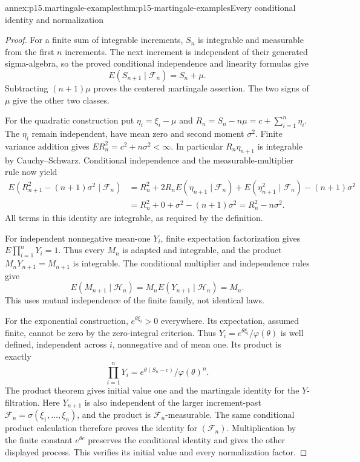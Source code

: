 
\begin{annexitem}{annex:p15.martingale-examples}{thm:p15-martingale-examples}{Every conditional identity and normalization}
\begin{proof}
For a finite sum of integrable increments, \(S_n\) is integrable
and measurable from the first \(n\) increments.
The next increment is independent of their generated sigma-algebra,
so the proved conditional independence and linearity formulas give
\[
                     E(S_{n+1}\mid\mathcal F_n)=S_n+\mu.
\]
Subtracting \((n+1)\mu\) proves the centered martingale assertion.
The two signs of \(\mu\) give the other two classes.

For the quadratic construction put
\(\eta_i=\xi_i-\mu\) and \(R_n=S_n-n\mu=c+\sum_{i=1}^n\eta_i\).
The \(\eta_i\) remain independent, have mean zero and second moment
\(\sigma^2\). Finite variance addition gives
\(ER_n^2=c^2+n\sigma^2<\infty\).
In particular \(R_n\eta_{n+1}\) is integrable by Cauchy--Schwarz.
Conditional independence and the measurable-multiplier rule now yield
\[
 \begin{aligned}
 E(R_{n+1}^2-(n+1)\sigma^2\mid\mathcal F_n)
   &=R_n^2+2R_nE(\eta_{n+1}\mid\mathcal F_n)
        +E(\eta_{n+1}^2\mid\mathcal F_n)-(n+1)\sigma^2\\
   &=R_n^2+0+\sigma^2-(n+1)\sigma^2
     =R_n^2-n\sigma^2.
 \end{aligned}
\]
All terms in this identity are integrable, as required by the definition.

For independent nonnegative mean-one \(Y_i\), finite expectation
factorization gives \(E\prod_{i=1}^nY_i=1\).
Thus every \(M_n\) is adapted and integrable, and the product
\(M_nY_{n+1}=M_{n+1}\) is integrable.
The conditional multiplier and independence rules give
\[
                       E(M_{n+1}\mid\mathcal H_n)
                          =M_nE(Y_{n+1}\mid\mathcal H_n)=M_n.
\]
This uses mutual independence of the finite family, not identical laws.

For the exponential construction, \(e^{\theta\xi_i}>0\) everywhere.
Its expectation, assumed finite, cannot be zero by the zero-integral
criterion. Thus \(Y_i=e^{\theta\xi_i}/\varphi(\theta)\) is well defined,
independent across \(i\), nonnegative and of mean one.
Its product is exactly
\[
                  \prod_{i=1}^nY_i
                       =e^{\theta(S_n-c)}/\varphi(\theta)^n.
\]
The product theorem gives initial value one and the martingale
identity for the \(Y\)-filtration.
Here \(Y_{n+1}\) is also independent of the larger increment-past
\(\mathcal F_n=\sigma(\xi_1,\ldots,\xi_n)\), and the product
is \(\mathcal F_n\)-measurable. The same conditional product
calculation therefore proves the identity for \((\mathcal F_n)\).
Multiplication by the finite constant \(e^{\theta c}\) preserves
the conditional identity and gives the other displayed process.
This verifies its initial value and every normalization factor.
\end{proof}
\end{annexitem}

